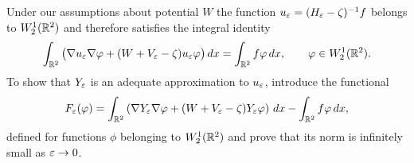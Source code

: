 Under our assumptions about potential $W$ the function $u_\varepsilon=(H_\varepsilon-\zeta)^{-1}f$ belongs to $W_2^1(\mathbb R^2)$ and therefore satisfies the integral identity
\begin{equation}\label{IntegralIdentityUe}
  \int_{\mathbb R^2}\big(\nabla u_\varepsilon \nabla \varphi+
              (W+V_\varepsilon-\zeta)u_\varepsilon \varphi\big)\,dx= \int_{\mathbb R^2}f\varphi\,dx, \qquad \varphi\in W_2^1(\mathbb R^2).
\end{equation}
To show  that $Y_\varepsilon$ is an adequate approximation to $u_\varepsilon$, introduce  the functional
\begin{equation}\label{Feps}
F_\varepsilon(\varphi)=\int_{\mathbb R^2}\left(\nabla Y_\varepsilon \nabla \varphi+
              (W+V_\varepsilon-\zeta)Y_\varepsilon \varphi\right)\,dx
            -   \int_{\mathbb R^2}f\varphi\,dx,
\end{equation}
defined for functions $\phi$ belonging to $W_2^1(\mathbb R^2)$ and prove that its norm is  infinitely small as $\varepsilon\to 0$.

